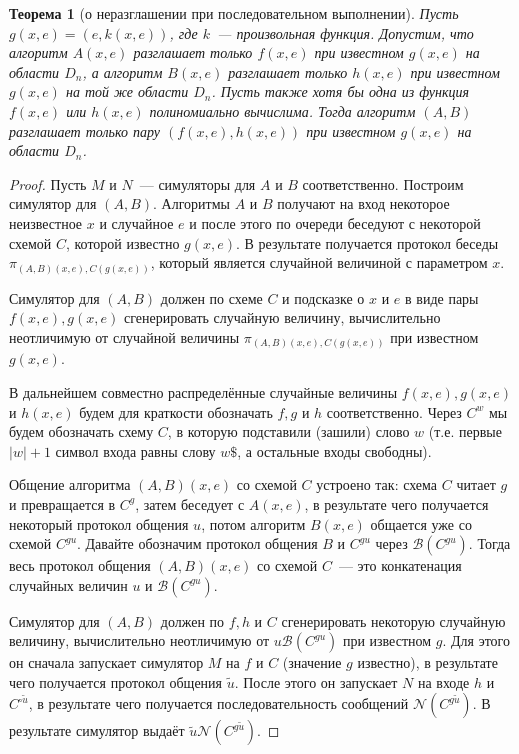 \documentclass[12pt,a4paper]{article}
\theoremstyle{definition}
\theoremstyle{plain}
\newtheorem{theorem}{Теорема}[section]
\theoremstyle{remark}
\begin{document}
\begin{theorem}[о неразглашении при последовательном выполнении]
\label{thm:repetition-knowledge}
Пусть $g(x,e) = (e, k(x,e))$, где $k$~--- произвольная функция.
Допустим, что алгоритм $A(x,e)$ разглашает только $f(x,e)$ при
известном $g(x,e)$ на области $D_n$, а алгоритм $B(x,e)$ разглашает
только $h(x,e)$ при известном $g(x,e)$ на той же области $D_n$.
Пусть также хотя бы одна из функция $f(x,e)$ или $h(x,e)$ полиномиально
вычислима. Тогда алгоритм $(A,B)$ разглашает только пару $(f(x,e),h(x,e))$
при известном $g(x,e)$ на области $D_n$.
\end{theorem}
\begin{proof}
Пусть $M$ и $N$~--- симуляторы для $A$ и $B$ соответственно. Построим симулятор для $(A,B)$.
Алгоритмы $A$ и $B$ получают на вход некоторое неизвестное $x$ и случайное $e$  и после 
этого по очереди беседуют с некоторой схемой $C$, которой известно $g(x,e)$. В результате
получается протокол беседы $\pi_{(A,B)(x,e),C(g(x,e))}$, который является случайной величиной
с параметром $x$.

Симулятор для $(A,B)$ должен по схеме $C$ и подсказке о $x$ и $e$ в виде пары $f(x,e), g(x,e)$
сгенерировать случайную величину, вычислительно неотличимую от случайной величины 
$\pi_{(A,B)(x,e),C(g(x,e))}$ при известном $g(x,e)$.

В дальнейшем совместно распределённые случайные величины $f(x,e), g(x,e)$ и $h(x,e)$
будем для краткости обозначать $f,g$ и $h$ соответственно. 
Через $C^w$ мы будем обозначать схему $C$, в которую подставили
(зашили) слово $w$ (т.е. первые $|w|+1$ символ входа равны слову $w\$$, 
а остальные входы свободны).

Общение алгоритма $(A,B)(x,e)$ со схемой $C$ устроено так: схема $C$ читает $g$
и превращается в $C^g$, затем беседует с $A(x,e)$, в результате чего получается
некоторый протокол общения $u$, потом алгоритм $B(x,e)$ общается уже со схемой 
$C^{gu}$. Давайте обозначим протокол общения $B$ и $C^{gu}$ через $\mathcal B(C^{gu})$.
Тогда весь протокол общения $(A,B)(x,e)$ со схемой $C$~--- это конкатенация
случайных величин $u$ и $\mathcal B(C^{gu})$.

Симулятор для $(A,B)$ должен по $f,h$ и $C$ сгенерировать некоторую случайную
величину, вычислительно неотличимую от $u\mathcal B(C^{gu})$ при известном $g$. Для
этого он сначала запускает симулятор $M$ на $f$ и $C$ (значение $g$ известно), в результате
чего получается протокол общения $\tilde{u}$. После этого он запускает $N$ на входе
$h$ и $C^{\square\tilde{u}}$, в результате чего получается последовательность сообщений
$\mathcal N(C^{g\tilde{u}})$. В результате симулятор выдаёт $\tilde{u}\mathcal N(C^{g\tilde{u}})$.


\end{proof}
\end{document}
